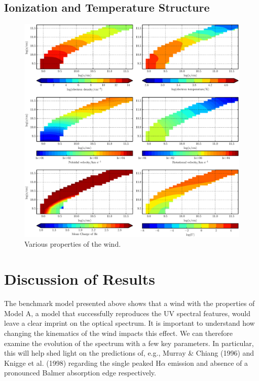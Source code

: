 \documentclass[preprint, a4paper, 11pt]{aastex}
\begin{document}
\subsection{Ionization and Temperature Structure}





\begin{figure} %
\includegraphics[width=\textwidth]{figures/fig5.eps}
\caption{Various properties of the wind.}
\label{wind}
\end{figure} %



%
%

\section{Discussion of Results}

The benchmark model presented above shows that a wind with the properties
of Model A, a model that successfully reproduces the UV spectral features,
would leave a clear imprint on the optical spectrum. It is important
to understand how changing the kinematics of the wind impacts this
effect. We can therefore examine the evolution
of the spectrum with a few key parameters. In particular, this
will help shed light on the predictions of, e.g., Murray \& Chiang (1996)
and Knigge et al. (1998) regarding the single peaked H$\alpha$ emission
and absence of a pronounced Balmer absorption edge respectively.
\end{document}
